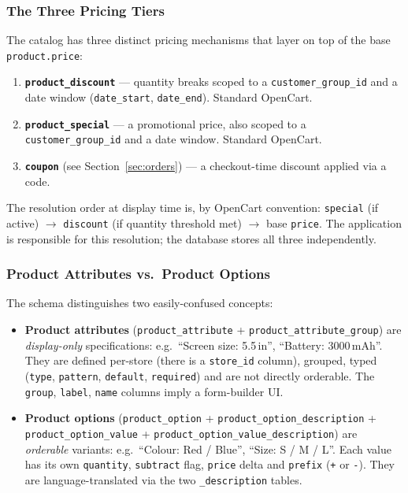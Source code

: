 \documentclass[11pt,a4paper]{article}
\begin{document}
\subsubsection{The Three Pricing Tiers}

The catalog has three distinct pricing mechanisms that layer on top of
the base \texttt{product.price}:

\begin{enumerate}[leftmargin=1.6em,itemsep=2pt]
  \item \textbf{\texttt{product\_discount}} --- quantity breaks scoped
        to a \texttt{customer\_group\_id} and a date window
        (\texttt{date\_start}, \texttt{date\_end}). Standard OpenCart.
  \item \textbf{\texttt{product\_special}} --- a promotional price,
        also scoped to a \texttt{customer\_group\_id} and a date
        window. Standard OpenCart.
  \item \textbf{\texttt{coupon}} (see Section~\ref{sec:orders}) ---
        a checkout-time discount applied via a code.
\end{enumerate}

The resolution order at display time is, by OpenCart convention:
\texttt{special} (if active) $\to$ \texttt{discount} (if quantity threshold
met) $\to$ base \texttt{price}. The application is responsible for this
resolution; the database stores all three independently.

\subsubsection{Product Attributes vs.\ Product Options}

The schema distinguishes two easily-confused concepts:

\begin{itemize}[leftmargin=1.6em,itemsep=2pt]
  \item \textbf{Product attributes} (\texttt{product\_attribute} +
        \texttt{product\_attribute\_group}) are \emph{display-only}
        specifications: e.g.\ ``Screen size: 5.5\,in'', ``Battery:
        3000\,mAh''. They are defined per-store (there is a
        \texttt{store\_id} column), grouped, typed
        (\texttt{type}, \texttt{pattern}, \texttt{default},
        \texttt{required}) and are not directly orderable. The
        \texttt{group}, \texttt{label}, \texttt{name} columns imply
        a form-builder UI.
  \item \textbf{Product options} (\texttt{product\_option} +
        \texttt{product\_option\_description} +
        \texttt{product\_option\_value} +
        \texttt{product\_option\_value\_description}) are
        \emph{orderable} variants: e.g.\ ``Colour: Red / Blue'',
        ``Size: S / M / L''. Each value has its own
        \texttt{quantity}, \texttt{subtract} flag, \texttt{price}
        delta and \texttt{prefix} (\texttt{+} or \texttt{-}). They
        are language-translated via the two
        \texttt{\_description} tables.
\end{itemize}
\end{document}
